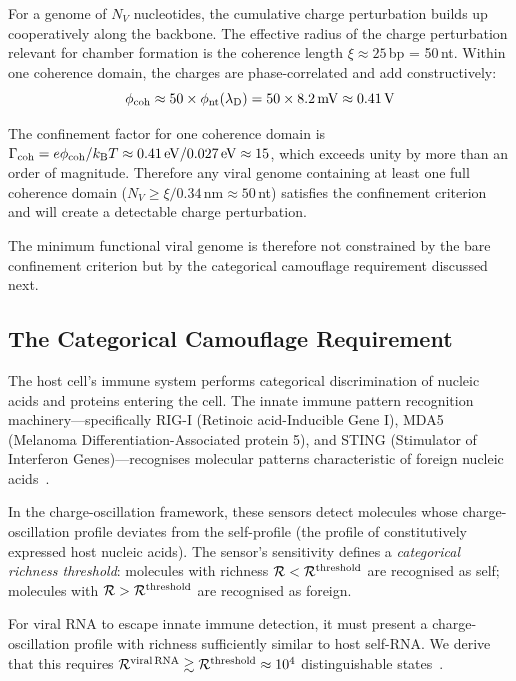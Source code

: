 For a genome of $N_V$ nucleotides, the cumulative charge perturbation builds up cooperatively along the backbone. The effective radius of the charge perturbation relevant for chamber formation is the coherence length $\xi \approx 25$\,bp = 50\,nt. Within one coherence domain, the charges are phase-correlated and add constructively:
\begin{equation}
  \phi_{\mathrm{coh}} \approx 50 \times \phi_{\mathrm{nt}}(\lambda_{\mathrm{D}}) = 50 \times 8.2\,\mathrm{mV} \approx 0.41\,\mathrm{V}
\end{equation}

The confinement factor for one coherence domain is $\Gamma_{\mathrm{coh}} = e\phi_{\mathrm{coh}} / k_{\mathrm{B}} T \approx 0.41\,\mathrm{eV} / 0.027\,\mathrm{eV} \approx 15$, which exceeds unity by more than an order of magnitude. Therefore any viral genome containing at least one full coherence domain ($N_V \geq \xi / 0.34\,\mathrm{nm} \approx 50$\,nt) satisfies the confinement criterion and will create a detectable charge perturbation.

The minimum functional viral genome is therefore not constrained by the bare confinement criterion but by the categorical camouflage requirement discussed next.

\subsection{The Categorical Camouflage Requirement}

The host cell's immune system performs categorical discrimination of nucleic acids and proteins entering the cell. The innate immune pattern recognition machinery---specifically RIG-I (Retinoic acid-Inducible Gene I), MDA5 (Melanoma Differentiation-Associated protein 5), and STING (Stimulator of Interferon Genes)---recognises molecular patterns characteristic of foreign nucleic acids~\cite{Yoneyama2004,Hornung2006,Ishikawa2008}.

In the charge-oscillation framework, these sensors detect molecules whose charge-oscillation profile deviates from the self-profile (the profile of constitutively expressed host nucleic acids). The sensor's sensitivity defines a \emph{categorical richness threshold}: molecules with richness $\mathcal{R} < \mathcal{R}^{\mathrm{threshold}}$ are recognised as self; molecules with $\mathcal{R} > \mathcal{R}^{\mathrm{threshold}}$ are recognised as foreign.

For viral RNA to escape innate immune detection, it must present a charge-oscillation profile with richness sufficiently similar to host self-RNA. We derive that this requires $\mathcal{R}^{\mathrm{viral\,RNA}} \gtrsim \mathcal{R}^{\mathrm{threshold}} \approx 10^4$ distinguishable states~\cite{Pichlmair2006}.

